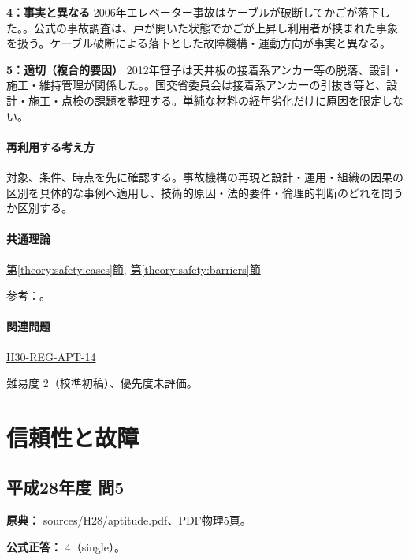 \noindent\textbf{4：事実と異なる} 2006年エレベーター事故はケーブルが破断してかごが落下した。。公式の事故調査は、戸が開いた状態でかごが上昇し利用者が挟まれた事象を扱う。ケーブル破断による落下とした故障機構・運動方向が事実と異なる。\par

\noindent\textbf{5：適切（複合的要因）} 2012年笹子は天井板の接着系アンカー等の脱落、設計・施工・維持管理が関係した。。国交省委員会は接着系アンカーの引抜き等と、設計・施工・点検の課題を整理する。単純な材料の経年劣化だけに原因を限定しない。\par

\paragraph{再利用する考え方} 対象、条件、時点を先に確認する。事故機構の再現と設計・運用・組織の因果の区別を具体的な事例へ適用し、技術的原因・法的要件・倫理的判断のどれを問うか区別する。

\paragraph{共通理論} \hyperref[theory:safety:cases]{第\ref*{theory:safety:cases}節}, \hyperref[theory:safety:barriers]{第\ref*{theory:safety:barriers}節}

\par 参考：\cite{mhlw_milk2002,milk_incident_company,muroran_ethics_cases,jtsb_fukuchiyama2007,caa_elevator2006,mlit_sasago2013}。

\paragraph{関連問題} \hyperref[q:h30-reg-apt-14]{H30-REG-APT-14}

\par 難易度 2（校準初稿）、優先度未評価。

\section{信頼性と故障}

\subsection{平成28年度 問5}
\label{q:h28-reg-apt-05}

\noindent\textbf{原典：} sources/H28/aptitude.pdf、PDF物理5頁。

\textbf{公式正答：} 4（single）。

